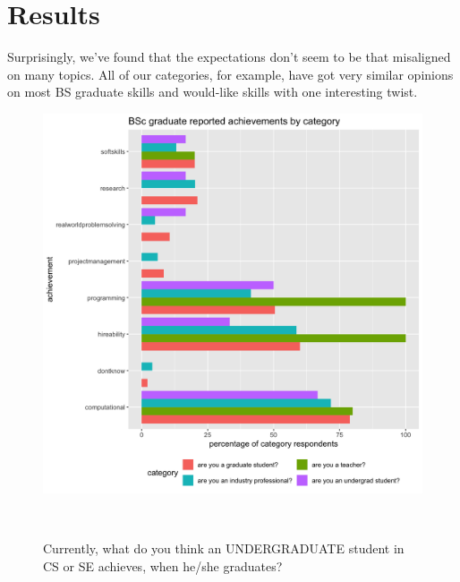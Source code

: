 \documentclass{sigchi}
\begin{document}
\section{Results}
Surprisingly, we've found that the expectations don't seem to be that misaligned on many topics. All of our categories, for example, have got very similar opinions on most BS graduate skills and would-like skills with one interesting twist.

\begin{figure}[h]
 \includegraphics[scale=0.2]{../data-analysis/plots_output/BSc_graduate_reported_achievements_by_category.png}
 \caption{Currently, what do you think an UNDERGRADUATE student in CS or SE achieves, when he/she graduates?}~\label{fig:figure1}
\end{figure}
\end{document}
